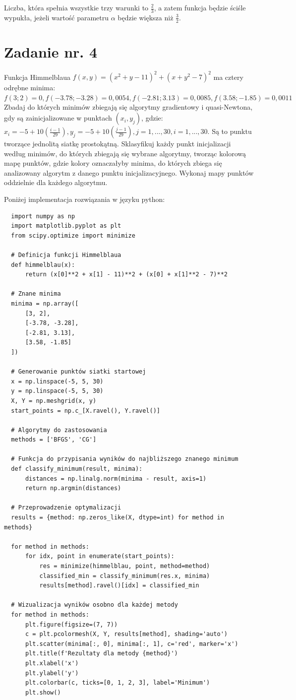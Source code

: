 \documentclass{article}
\begin{document}
Liczba, która spełnia wszystkie trzy warunki to $\frac{2}{3}$, a zatem funkcja będzie ściśle
wypukła, jeżeli wartość parametru $\alpha$ będzie większa niż $\frac{3}{2}$.

\section{Zadanie nr. 4}

Funkcja Himmelblaua $f(x,y)=(x^2 + y -11)^2 + (x + y^2 - 7)^2 $ ma cztery 
odrębne minima: $f(3;2)=0, f(-3.78;-3.28)=0,0054, f(-2.81;3.13)=0,0085 , f(3.58;-1.85)=0,0011 $ 
Zbadaj do których minimów zbiegają się algorytmy gradientowy
i quasi-Newtona, gdy są zainicjalizowane w punktach $(x_i, y_j)$, gdzie:
$x_i = -5+10(\frac{i-1}{29}), y_j = -5+10(\frac{j-1}{29}), j= 1,...,30, i=1,...,30.$
Są to punktu tworzące 
jednolitą siatkę prostokątną. Sklasyfikuj każdy punkt inicjalizacji według minimów, do 
których zbiegają się wybrane algorytmy, tworząc kolorową mapę punktów, gdzie kolory 
oznaczałyby minima, do których zbiega się analizowany algorytm z danego punktu 
inicjalizacyjnego. Wykonaj mapy punktów oddzielnie dla każdego algorytmu.

Poniżej implementacja rozwiązania w języku python:
\begin{lstlisting}
  import numpy as np
  import matplotlib.pyplot as plt
  from scipy.optimize import minimize
  
  # Definicja funkcji Himmelblaua
  def himmelblau(x):
      return (x[0]**2 + x[1] - 11)**2 + (x[0] + x[1]**2 - 7)**2
  
  # Znane minima
  minima = np.array([
      [3, 2],
      [-3.78, -3.28],
      [-2.81, 3.13],
      [3.58, -1.85]
  ])
  
  # Generowanie punktów siatki startowej
  x = np.linspace(-5, 5, 30)
  y = np.linspace(-5, 5, 30)
  X, Y = np.meshgrid(x, y)
  start_points = np.c_[X.ravel(), Y.ravel()]
  
  # Algorytmy do zastosowania
  methods = ['BFGS', 'CG']
  
  # Funkcja do przypisania wyników do najbliższego znanego minimum
  def classify_minimum(result, minima):
      distances = np.linalg.norm(minima - result, axis=1)
      return np.argmin(distances)
  
  # Przeprowadzenie optymalizacji
  results = {method: np.zeros_like(X, dtype=int) for method in methods}
  
  for method in methods:
      for idx, point in enumerate(start_points):
          res = minimize(himmelblau, point, method=method)
          classified_min = classify_minimum(res.x, minima)
          results[method].ravel()[idx] = classified_min
  
  # Wizualizacja wyników osobno dla każdej metody
  for method in methods:
      plt.figure(figsize=(7, 7))
      c = plt.pcolormesh(X, Y, results[method], shading='auto')
      plt.scatter(minima[:, 0], minima[:, 1], c='red', marker='x')
      plt.title(f'Rezultaty dla metody {method}')
      plt.xlabel('x')
      plt.ylabel('y')
      plt.colorbar(c, ticks=[0, 1, 2, 3], label='Minimum')
      plt.show()
    
\end{lstlisting}
\end{document}
